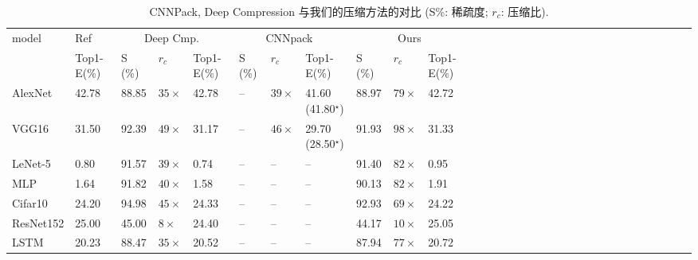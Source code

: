 \begin{table}[t]
\centering
\caption{\footnotesize CNNPack, Deep Compression 与我们的压缩方法的对比 (S\%: 稀疏度; $r_c$: 压缩比).}
\scriptsize
\label{tab:deepratio}
\centering
\begin{tabular}{l@{~~}@{~~}lll@{~~}lll@{~~}lllll@{~~}lll@{~~}lll@{~~}lllll@{~~}lll@{~~}lll@{~~}ll}
\toprule
model 	& Ref 				& \multicolumn{3}{c}{Deep Cmp.~\cite{han2015deep}} 	& \multicolumn{3}{c}{CNNpack~\cite{wang2016cnnpack}} 	& \multicolumn{3}{c}{Ours}				\\
  		& Top1-E(\%) 		& S (\%) & $r_c$ & Top1-E(\%) 	 					& S (\%) & $r_c$ & Top1-E(\%)  	 						&S (\%) & $r_c$ & Top1-E(\%) 		\\
\midrule
AlexNet  	& 42.78			& 88.85	& $35\times$ 	& 42.78 							& --	 &  $39\times$  & 41.60 (41.80$^{\star}$) 				 		& 88.97 & $79\times$	& 42.72				\\
VGG16		& 31.50			& 92.39	& $49\times$ 	& 31.17								& --	 &  $46\times$  & 29.70 (28.50$^{\star}$)							& 91.93  & $98\times$ 	& 31.33				\\
LeNet-5 	& 0.80			& 91.57	& $39\times$ 	& 0.74 								& --	 &  --   & --									& 91.40  & $82\times$ 	& 0.95			 	\\
MLP 		& 1.64			& 91.82	& $40\times$ 	& 1.58								& --  	 &  -- 	 & -- 									& 90.13  & $82\times$ 	& 1.91				\\
Cifar10 	& 24.20			& 94.98	& $45\times$ 	& 24.33								& --	 &  --   & -- 									& 92.93  & $69\times$   & 24.22				\\
ResNet152 	& 25.00			& 45.00 & $8\times$		& 24.40 							& --	 &  --	 & -- 									& 44.17 & $10\times$ 	& 25.05				\\
LSTM 		& 20.23			& 88.47 & $35\times$ 	& 20.52								& --	 &  --   & --									& 87.94	& $77\times$ 	& 20.72				\\
\bottomrule
\end{tabular}
\end{table}

